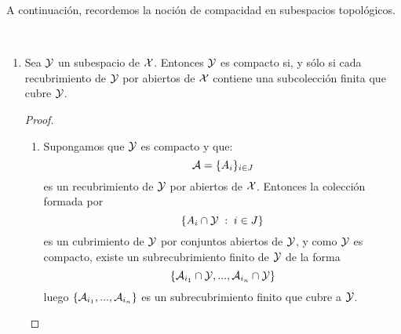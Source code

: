 A continuación, recordemos la noción de compacidad en subespacios topológicos.

\begin{obs} \
	\begin{enumerate}
		\item Sea $\mathcal{Y}$ un subespacio de $\mathcal{X}$. Entonces $\mathcal{Y}$ es compacto si, y sólo si cada recubrimiento de $\mathcal{Y}$ por abiertos de $\mathcal{X}$ contiene una subcolección finita que cubre $\mathcal{Y}$.
		\begin{proof} \
			\begin{enumerate}
				\item[\bra] 	Supongamos que $\mathcal{Y}$ es compacto y que:
					\begin{equation*}
						\mathcal{A}=\{A_i\}_{i \in J}
					\end{equation*}
					es un recubrimiento de $\mathcal{Y}$ por abiertos de $\mathcal{X}$. Entonces la colección formada por
					\begin{equation*}
						\{A_i \cap \mathcal{Y} \;:\; i \in J\}
					\end{equation*} es un cubrimiento de $\mathcal{Y}$ por conjuntos abiertos de $\mathcal{Y}$, y como $\mathcal{Y}$ es compacto, existe un subrecubrimiento finito de $\mathcal{Y}$ de la forma
					\begin{equation*}
						\{\mathcal{A}_{i_1} \cap \mathcal{Y}, ... , \mathcal{A}_{i_n} \cap \mathcal{Y}\} 
					\end{equation*}
						luego $\{\mathcal{A}_{i_1}, ... , \mathcal{A}_{i_n}\}$ es un subrecubrimiento finito que cubre a $\mathcal{Y}$.
				

\end{enumerate}
\end{proof}
\end{enumerate}
\end{obs}
